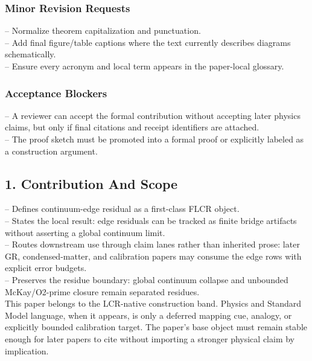 \documentclass[11pt]{article}
\begin{document}
\subsubsection*{Minor Revision Requests}

\noindent{}-- Normalize theorem capitalization and punctuation.\\
\noindent{}-- Add final figure/table captions where the text currently describes diagrams schematically.\\
\noindent{}-- Ensure every acronym and local term appears in the paper-local glossary.\\

\subsubsection*{Acceptance Blockers}

\noindent{}-- A reviewer can accept the formal contribution without accepting later physics claims, but only if final citations and receipt identifiers are attached.\\
\noindent{}-- The proof sketch must be promoted into a formal proof or explicitly labeled as a construction argument.\\


\subsection*{1. Contribution And Scope}

\noindent{}-- Defines continuum-edge residual as a first-class FLCR object.\\
\noindent{}-- States the local result: edge residuals can be tracked as finite bridge artifacts without asserting a global continuum limit.\\
\noindent{}-- Routes downstream use through claim lanes rather than inherited prose: later GR, condensed-matter, and calibration papers may consume the edge rows with explicit error budgets.\\
\noindent{}-- Preserves the residue boundary: global continuum collapse and unbounded McKay/O2-prime closure remain separated residues.\\

This paper belongs to the LCR-native construction band. Physics and Standard Model language, when it appears, is only a deferred mapping cue, analogy, or explicitly bounded calibration target. The paper's base object must remain stable enough for later papers to cite without importing a stronger physical claim by implication.
\end{document}
